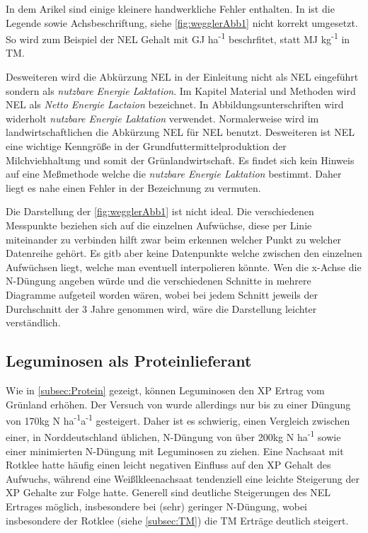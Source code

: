 In dem Arikel \parencite[33-36]{weggler2050leguminosen} sind einige kleinere handwerkliche Fehler enthalten.
In \textcite[35]{weggler2050leguminosen} ist die Legende sowie Achsbeschriftung, siehe \cref{fig:wegglerAbb1} nicht korrekt umgesetzt.
So wird zum Beispiel der \ac{NEL} Gehalt mit GJ ha\textsuperscript{-1} beschrfitet, statt MJ kg\textsuperscript{-1} in \ac{TM}.

Desweiteren wird die Abkürzung \ac{NEL} in der Einleitung nicht als \acl{NEL} eingeführt sondern als \textit{nutzbare Energie Laktation}.
Im Kapitel Material und Methoden wird \ac{NEL} als \textit{Netto Energie Lactaion} bezeichnet.
In Abbildungsunterschriften wird widerholt \textit{nutzbare Energie Laktation} verwendet.
Normalerweise wird im landwirtschaftlichen die Abkürzung \ac{NEL} für \acl{NEL} benutzt.
Desweiteren ist \ac{NEL} eine wichtige Kenngröße in der Grundfuttermittelproduktion der Milchviehhaltung und somit der Grünlandwirtschaft.
Es findet sich kein Hinweis auf eine Meßmethode welche die \textit{nutzbare Energie Laktation} bestimmt.
Daher liegt es nahe einen Fehler in der Bezeichnung zu vermuten.

Die Darstellung der \cref{fig:wegglerAbb1} ist nicht ideal.
Die verschiedenen Messpunkte beziehen sich auf die einzelnen Aufwüchse, diese per Linie miteinander zu verbinden hilft zwar beim erkennen welcher Punkt zu welcher Datenreihe gehört.
Es gitb aber keine Datenpunkte welche zwischen den einzelnen Aufwüchsen liegt, welche man eventuell interpolieren könnte.
Wen die x-Achse die N-Düngung angeben würde und die verschiedenen Schnitte in mehrere Diagramme aufgeteil worden wären, wobei bei jedem Schnitt jeweils der Durchschnitt der 3 Jahre genommen wird, wäre die Darstellung leichter verständlich.


\subsection{Leguminosen als Proteinlieferant}
\label{sub:leguminosen}
Wie in \ref{subsec:Protein} gezeigt, können Leguminosen den \ac{XP} Ertrag vom Grünland erhöhen.
Der Versuch von \textcite[33-36]{weggler2050leguminosen} wurde allerdings nur bis zu einer Düngung von 170kg N ha\textsuperscript{-1}a\textsuperscript{-1} gesteigert.
Daher ist es schwierig, einen Vergleich zwischen einer, in Norddeutschland üblichen, N-Düngung von über 200kg N ha\textsuperscript{-1} sowie einer minimierten N-Düngung mit Leguminosen zu ziehen.
Eine Nachsaat mit Rotklee hatte häufig einen leicht negativen Einfluss auf den \ac{XP} Gehalt des Aufwuchs, während eine Weißlkleenachsaat tendenziell eine leichte Steigerung der \ac{XP} Gehalte zur Folge hatte.
Generell sind deutliche Steigerungen des \ac{NEL} Ertrages möglich, insbesondere bei (sehr) geringer N-Düngung, wobei insbesondere der Rotklee (siehe \ref{subsec:TM}) die \ac{TM} Erträge deutlich steigert.

